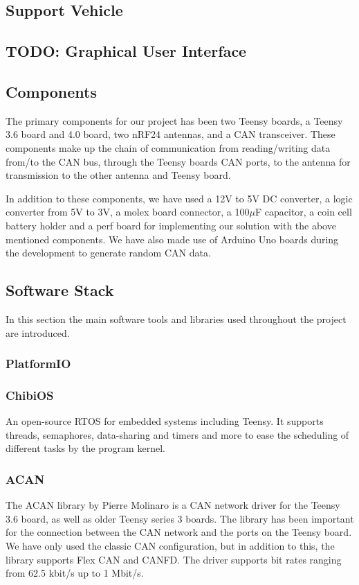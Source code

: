 \documentclass[conference]{IEEEtran}
\newcommand{\todo}[1]{{\color{olive} TODO: #1}}
\begin{document}
\subsection{Support Vehicle}
\subsection{\todo{Graphical User Interface}}


\subsection{Components}
The primary components for our project has been two Teensy boards, a Teensy 3.6 board and 4.0 board, two nRF24 antennas, and a CAN transceiver. These components make up the chain of communication from reading/writing data from/to the CAN bus, through the Teensy boards CAN ports, to the antenna for transmission to the other antenna and Teensy board.

In addition to these components, we have used a 12V to 5V DC converter, a logic converter from 5V to 3V, a molex board connector, a 100\(\mu\)F capacitor, a coin cell battery holder and a perf board for implementing our solution with the above mentioned components. We have also made use of Arduino Uno boards during the development to generate random CAN data.

\subsection{Software Stack}

In this section the main software tools and libraries used throughout the project are introduced.

\subsubsection{PlatformIO}


\subsubsection{ChibiOS}
An open-source RTOS for embedded systems including Teensy. It supports threads, semaphores, data-sharing and timers and more to ease the scheduling of different tasks by the program kernel. 

\subsubsection{ACAN}
The ACAN library by Pierre Molinaro is a CAN network driver for the Teensy 3.6 board, as well as older Teensy series 3 boards. The library has been important for the connection between the CAN network and the ports on the Teensy board. We have only used the classic CAN configuration, but in addition to this, the library supports Flex CAN and CANFD. The driver supports bit rates ranging from 62.5 kbit/s up to 1 Mbit/s\cite{ACAN}.
\end{document}
